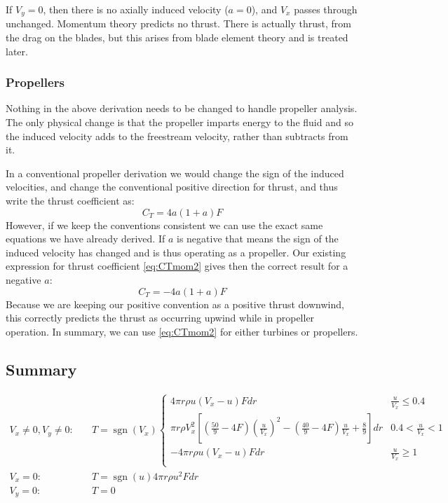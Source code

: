 \documentclass{article}
\DeclareMathOperator{\sgn}{sgn}
\begin{document}
If $V_y = 0$, then there is no axially induced velocity ($a = 0$), and $V_x$ passes through unchanged. Momentum theory predicts no thrust.  There is actually thrust, from the drag on the blades, but this arises from blade element theory and is treated later.




\subsubsection{Propellers}

Nothing in the above derivation needs to be changed to handle propeller analysis.  The only physical change is that the propeller imparts energy to the fluid and so the induced velocity adds to the freestream velocity, rather than subtracts from it.

In a conventional propeller derivation we would change the sign of the induced velocities, and change the conventional positive direction for thrust, and thus write the thrust coefficient as:
\begin{equation}
    C_T = 4 a (1 + a) F
\end{equation}
However, if we keep the conventions consistent we can use the exact same equations we have already derived.  If $a$ is negative that means the sign of the induced velocity has changed and is thus operating as a propeller.  Our existing expression for thrust coefficient \cref{eq:CTmom2} gives then the correct result for a negative $a$:
\begin{equation}
    C_T = - 4 a (1 + a) F
\end{equation}
Because we are keeping our positive convention as a positive thrust downwind, this correctly predicts the thrust as occurring upwind while in propeller operation.  In summary, we can use \cref{eq:CTmom2} for either turbines or propellers.

\subsection{Summary}
\label{sec:momsum}

\begin{equation}
\begin{aligned}
    V_x \ne 0, V_y \ne 0:&\quad
    T = \sgn(V_x)
    \begin{cases}
        4 \pi r \rho u (V_x - u) F dr &  \frac{u}{V_x} \le 0.4 \\
        \pi r \rho V_x^2 \left[\left(\frac{50}{9} - 4F\right) \left(\frac{u}{V_x}\right)^2 - \left(\frac{40}{9} - 4F\right) \frac{u}{V_x} + \frac{8}{9} \right] dr  &  0.4 < \frac{u}{V_x} < 1 \\
        -4 \pi r \rho u (V_x - u) F dr &  \frac{u}{V_x} \ge 1 \\
    \end{cases}\\
    V_x = 0:&\quad  T =
        \sgn(u) 4 \pi r \rho u^2 F dr\\
    V_y = 0:&\quad T = 0\\
\end{aligned}
\label{eq:Tmomsum}
\end{equation}
\end{document}
